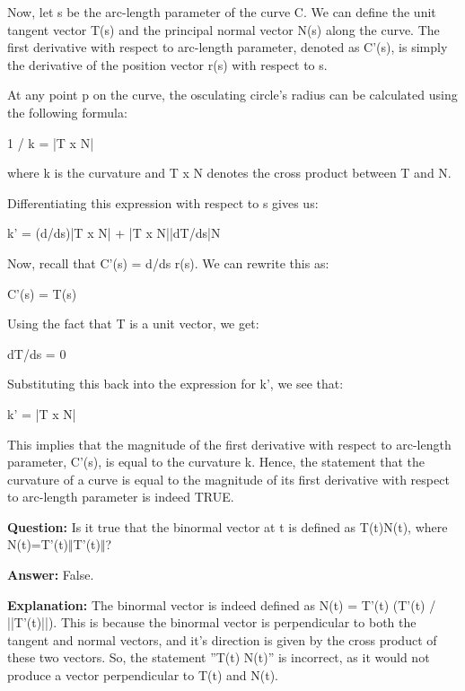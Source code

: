 \documentclass{article}
\begin{document}
Now, let s be the arc-length parameter of the curve C. We can define the unit tangent vector T(s) and the principal normal vector N(s) along the curve. The first derivative with respect to arc-length parameter, denoted as C'(s), is simply the derivative of the position vector r(s) with respect to s.

At any point p on the curve, the osculating circle's radius can be calculated using the following formula:

1 / k = |T x N|

where k is the curvature and T x N denotes the cross product between T and N.

Differentiating this expression with respect to s gives us:

k' = (d/ds)|T x N| + |T x N||dT/ds|N

Now, recall that C'(s) = d/ds r(s). We can rewrite this as:

C'(s) = T(s)

Using the fact that T is a unit vector, we get:

dT/ds = 0

Substituting this back into the expression for k', we see that:

k' = |T x N|

This implies that the magnitude of the first derivative with respect to arc-length parameter, C'(s), is equal to the curvature k. Hence, the statement that the curvature of a curve is equal to the magnitude of its first derivative with respect to arc-length parameter is indeed TRUE.
                
                \vspace{0.5cm} 
        
            
                \textbf {Question:} Is it true that the binormal vector at t is defined as T(t){\texttimes}N(t), where N(t)=T'(t)\ensuremath{\Vert}T'(t)\ensuremath{\Vert}?
                
                \textbf{Answer:} False.

                \textbf{Explanation:} The binormal vector is indeed defined as N(t) = T'(t) {\texttimes} (T'(t) / ||T'(t)||). This is because the binormal vector is perpendicular to both the tangent and normal vectors, and it's direction is given by the cross product of these two vectors. So, the statement ''T(t) {\texttimes} N(t)'' is incorrect, as it would not produce a vector perpendicular to T(t) and N(t).
                
                \vspace{0.5cm} 
        
\end{document}
